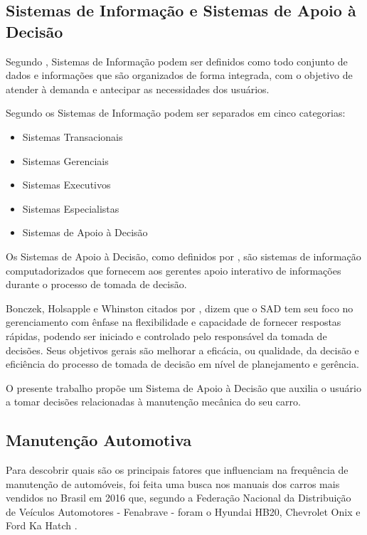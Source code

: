\documentclass[12pt]{article}
\begin{document}
\subsection{Sistemas de Informação e Sistemas de Apoio à Decisão} \label{sec:sisad}
Segundo , Sistemas de Informação podem ser definidos
como todo conjunto de dados e informações que são organizados de forma
integrada, com o objetivo de atender à demanda e antecipar as necessidades dos
usuários.

Segundo  os Sistemas de Informação podem ser
separados em cinco categorias:

\begin{itemize}
    \item Sistemas Transacionais
    \item Sistemas Gerenciais
    \item Sistemas Executivos
    \item Sistemas Especialistas
    \item Sistemas de Apoio à Decisão
\end{itemize}

Os Sistemas de Apoio à Decisão, como definidos por ,
são sistemas de informação computadorizados que fornecem aos gerentes apoio
interativo de informações durante o processo de tomada de decisão.

Bonczek, Holsapple e Whinston citados por , dizem que
o SAD tem seu foco no gerenciamento com ênfase na flexibilidade e capacidade de
fornecer respostas rápidas, podendo ser iniciado e controlado pelo responsável
da tomada de decisões. Seus objetivos gerais são melhorar a eficácia, ou
qualidade, da decisão e eficiência do processo de tomada de decisão em nível de
planejamento e gerência.

O presente trabalho propõe um Sistema de Apoio à Decisão que auxilia o usuário
a tomar decisões relacionadas à manutenção mecânica do seu carro.

\subsection{Manutenção Automotiva} \label{sec:manutencao}
Para descobrir quais são os principais fatores que influenciam na frequência de
manutenção de automóveis, foi feita uma busca nos manuais dos carros mais vendidos
no Brasil em 2016 que, segundo a Federação Nacional da Distribuição de Veículos
Automotores - Fenabrave - foram o Hyundai HB20, Chevrolet Onix e Ford Ka Hatch
\cite{fenabrave}.
\end{document}

